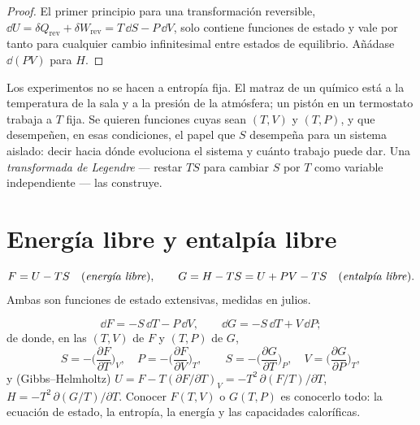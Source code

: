 \begin{proof}
El primer principio para una transformación reversible, $\dd U = \delta Q_{\text{rev}}
+ \delta W_{\text{rev}} = T\,\dd S - P\,\dd V$, solo contiene funciones de
estado y vale por tanto para cualquier cambio infinitesimal entre
estados de equilibrio. Añádase $\dd(PV)$ para $H$.
\end{proof}

\begin{remark}\label{rem:b2:thermodynamic-potentials:why}
Los experimentos no se hacen a entropía fija. El matraz de un químico está a
la temperatura de la sala y a la presión de la atmósfera; un
pistón en un termostato trabaja a $T$ fija. Se quieren funciones cuyas
 sean $(T,V)$ y $(T,P)$, y que desempeñen, en esas
condiciones, el papel que $S$ desempeña para un sistema aislado: decir
hacia dónde evoluciona el sistema y cuánto trabajo puede dar. Una
\emph{transformada de Legendre} --- restar $TS$ para cambiar $S$ por $T$ como
variable independiente --- las construye.
\end{remark}

\section{Energía libre y entalpía libre}

\begin{definition}\label{def:b2:thermodynamic-potentials:FG}
\[
F = U - TS \quad\text{(\emph{energía libre}\index{energía libre})}, \qquad
G = H - TS = U + PV - TS \quad\text{(\emph{entalpía libre}\index{entalpía libre})}.
\]
Ambas son funciones de estado extensivas, medidas en julios.
\end{definition}

\begin{theorem}\label{thm:b2:thermodynamic-potentials:dFdG}
\[
\dd F = -S\,\dd T - P\,\dd V, \qquad
\dd G = -S\,\dd T + V\,\dd P ;
\]
de donde, en las  $(T,V)$ de $F$ y $(T,P)$ de $G$,
\[
S = -\Big(\frac{\partial F}{\partial T}\Big)_V, \quad
P = -\Big(\frac{\partial F}{\partial V}\Big)_T, \qquad
S = -\Big(\frac{\partial G}{\partial T}\Big)_P, \quad
V = \Big(\frac{\partial G}{\partial P}\Big)_T ,
\]
y (Gibbs--Helmholtz) $U = F - T(\partial F/\partial T)_V =
-T^2\,\partial(F/T)/\partial T$, $H = -T^2\,\partial(G/T)/\partial T$.
Conocer $F(T,V)$ o $G(T,P)$ es conocerlo todo: la ecuación de
estado, la entropía, la energía y las capacidades caloríficas.
\end{theorem}

